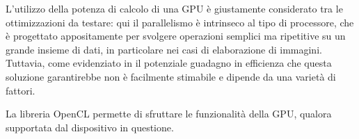 L'utilizzo della potenza di calcolo di una GPU è giustamente considerato tra le ottimizzazioni da testare: qui il parallelismo
è intrinseco al tipo di processore, che è progettato appositamente per svolgere operazioni semplici ma ripetitive su un grande
insieme di dati, in particolare nei casi di elaborazione di immagini. Tuttavia, come evidenziato in \cite{rs12122047}
il potenziale guadagno in efficienza che questa soluzione garantirebbe non è facilmente stimabile e dipende da una varietà di
fattori.

La libreria OpenCL permette di sfruttare le funzionalità della GPU, qualora supportata dal dispositivo in questione.
